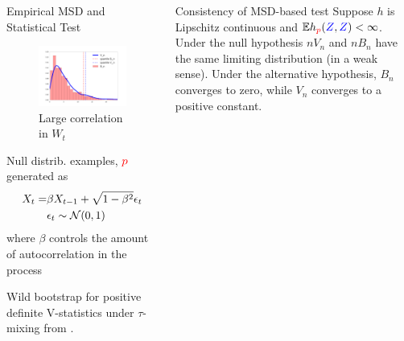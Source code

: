 \begin{frame}
\begin{columns}
\begin{column}{.33\linewidth}
\begin{block}{Empirical MSD and Statistical Test}
 \begin{center}
  \begin{minipage}{.49\linewidth}
\begin{figure}
 \includegraphics[width=\textwidth]{../../presentation/img/bootstrapWorks7.pdf}
 \caption{%
 Large correlation in $W_t$} 
\end{figure}
  \end{minipage}
\begin{minipage}{.49\linewidth}
Null distrib. examples, ${\color{red} p}$ generated as
\begin{align*}
 X_t =& \beta X_{t-1} + \sqrt{1 - \beta^2}\epsilon_t\\
 & \epsilon_t \sim {\cal N}(0,1)
\end{align*}
 where $\beta$ controls the amount of autocorrelation in the process
\end{minipage}
\end{center}

 Wild bootstrap for positive definite V-statistics under $\tau$-mixing from \cite{leucht_dependent_2013}.
\end{block}
\end{column}


\hspace{-1.45cm}


\begin{column}{.32\linewidth}
\begin{block}{Consistency of MSD-based test}
\large
 Suppose  $h$ is Lipschitz continuous and
$\mathbb{E} h_{{ \color{red} p}}({ \color{blue} Z},{ \color{blue} Z})<\infty$. Under the null hypothesis $nV_n$ and $nB_n$ have the same limiting distribution (in a weak sense). Under the alternative hypothesis,
$B_{n}$ converges to zero, while $V_{n}$ converges to a positive
constant.


\end{block}
\end{column}
\end{columns}
\end{frame}
